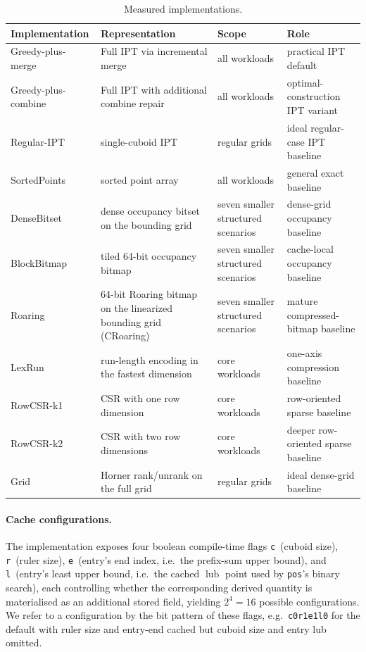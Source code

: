 \documentclass[manuscript,screen,review]{acmart}
\theoremstyle{definition}
\theoremstyle{plain}
\begin{document}
\begin{table}[ht]
\centering
\caption{Measured implementations.}
\label{table:implementations}
\small
\begin{tabular}{p{2.8cm}p{3.2cm}p{2.7cm}p{4.5cm}}
\toprule
Implementation & Representation & Scope & Role \\
\midrule
Greedy-plus-merge
  & Full IPT via incremental merge
  & all workloads
  & practical IPT default \\
Greedy-plus-combine
  & Full IPT with additional combine repair
  & all workloads
  & optimal-construction IPT variant \\
Regular-IPT
  & single-cuboid IPT
  & regular grids
  & ideal regular-case IPT baseline \\
SortedPoints
  & sorted point array
  & all workloads
  & general exact baseline \\
DenseBitset
  & dense occupancy bitset on the bounding grid
  & seven smaller structured scenarios
  & dense-grid occupancy baseline \\
BlockBitmap
  & tiled 64-bit occupancy bitmap
  & seven smaller structured scenarios
  & cache-local occupancy baseline \\
Roaring
  & 64-bit Roaring bitmap on the linearized bounding grid (CRoaring)
  & seven smaller structured scenarios
  & mature compressed-bitmap baseline \\
LexRun
  & run-length encoding in the fastest dimension
  & core workloads
  & one-axis compression baseline \\
RowCSR-k1
  & CSR with one row dimension
  & core workloads
  & row-oriented sparse baseline \\
RowCSR-k2
  & CSR with two row dimensions
  & core workloads
  & deeper row-oriented sparse baseline \\
Grid
  & Horner rank/unrank on the full grid
  & regular grids
  & ideal dense-grid baseline \\
\bottomrule
\end{tabular}
\end{table}

\paragraph{Cache configurations.}
The implementation exposes four boolean compile-time flags
\texttt{c}~(cuboid size), \texttt{r}~(ruler size), \texttt{e}~(entry's
end index, i.e.\ the prefix-sum upper bound), and \texttt{l}~(entry's
least upper bound, i.e.\ the cached \(\operatorname{lub}\) point used
by \texttt{pos}'s binary search), each controlling whether the
corresponding derived quantity is materialised as an additional stored
field, yielding $2^4 = 16$ possible configurations. We refer to a
configuration by the bit pattern of these flags, e.g.\ \texttt{c0r1e1l0}
for the default with ruler size and entry-end cached but cuboid size
and entry lub omitted.
\end{document}
